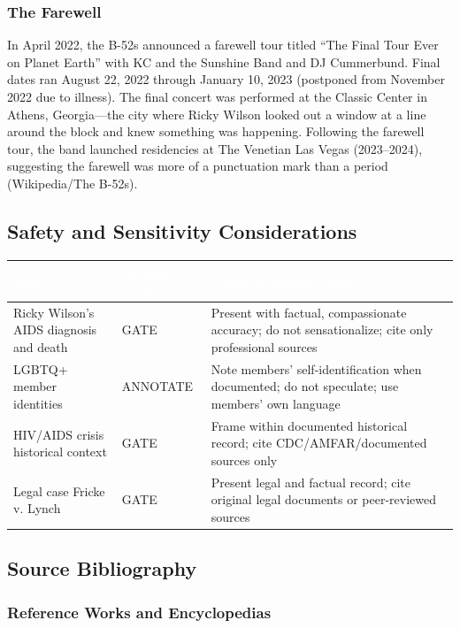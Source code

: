 \documentclass[11pt,letterpaper]{article}
\newcommand{\tableheader}[1]{\textbf{\sffamily\textcolor{white}{#1}}}
\begin{document}
\subsubsection{The Farewell}

In April 2022, the B-52s announced a farewell tour titled ``The Final Tour Ever on Planet Earth'' with KC and the Sunshine Band and DJ Cummerbund. Final dates ran August 22, 2022 through January 10, 2023 (postponed from November 2022 due to illness). The final concert was performed at the Classic Center in Athens, Georgia---the city where Ricky Wilson looked out a window at a line around the block and knew something was happening. Following the farewell tour, the band launched residencies at The Venetian Las Vegas (2023--2024), suggesting the farewell was more of a punctuation mark than a period (Wikipedia/The B-52s).

\subsection{Safety and Sensitivity Considerations}

\begin{center}
\begin{tabularx}{\textwidth}{L{4cm}L{2.5cm}X}
\toprule
{}
\tableheader{Topic} & \tableheader{Boundary Type} & \tableheader{Handling Requirement} \\
\midrule
Ricky Wilson's AIDS diagnosis and death & GATE & Present with factual, compassionate accuracy; do not sensationalize; cite only professional sources \\
LGBTQ+ member identities & ANNOTATE & Note members' self-identification when documented; do not speculate; use members' own language \\
HIV/AIDS crisis historical context & GATE & Frame within documented historical record; cite CDC/AMFAR/documented sources only \\
Legal case Fricke v. Lynch & GATE & Present legal and factual record; cite original legal documents or peer-reviewed sources \\
\bottomrule
\end{tabularx}
\end{center}

\subsection{Source Bibliography}

\subsubsection{Reference Works and Encyclopedias}
\end{document}
